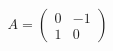 \documentclass[preview]{standalone}
\begin{document}
\begin{align*}
A = \begin{pmatrix} 0 & -1 \\ 1 & 0 \end{pmatrix}
\end{align*}
\end{document}
